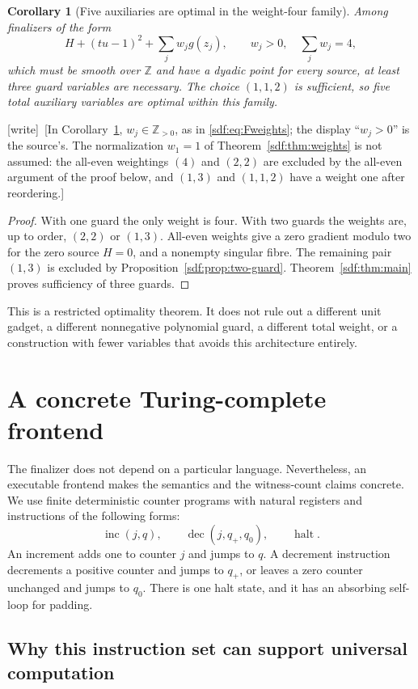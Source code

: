 \documentclass[11pt,a4paper]{article}
\newtheorem{corollary}[theorem]{Corollary}
\theoremstyle{definition}
\theoremstyle{remark}
\newcommand{\Z}{\mathbb Z}
\newcommand{\guard}{g}
\newcommand{\wtag}{\textup{[write]}}
\begin{document}
\begin{corollary}[Five auxiliaries are optimal in the weight-four family]\label{sdf:cor:five}
Among finalizers of the form
\[
 H+(tu-1)^2+\sum_jw_j\guard(z_j),\qquad
 w_j>0,\quad \sum_jw_j=4,
\]
which must be smooth over $\Z$ and have a dyadic point for every source,
at least three guard variables are necessary. The choice $(1,1,2)$ is
sufficient, so five total auxiliary variables are optimal within this family.
\end{corollary}
\noindent\wtag\ [In Corollary~\ref{sdf:cor:five}, $w_j\in\Z_{>0}$, as in
\eqref{sdf:eq:Fweights}; the display ``$w_j>0$'' is the source's. The
normalization $w_1=1$ of Theorem~\ref{sdf:thm:weights} is not assumed: the
all-even weightings $(4)$ and $(2,2)$ are excluded by the all-even argument
of the proof below, and $(1,3)$ and $(1,1,2)$ have a weight one after
reordering.]
\begin{proof}
With one guard the only weight is four. With two guards the weights are,
up to order, $(2,2)$ or $(1,3)$. All-even weights give a zero gradient
modulo two for the zero source $H=0$, and a nonempty singular fibre.
The remaining pair $(1,3)$ is excluded by Proposition~\ref{sdf:prop:two-guard}.
Theorem~\ref{sdf:thm:main} proves sufficiency of three guards.
\end{proof}

This is a restricted optimality theorem. It does not rule out a different
unit gadget, a different nonnegative polynomial guard, a different total
weight, or a construction with fewer variables that avoids this architecture
entirely.

\section{A concrete Turing-complete frontend}\label{sdf:sec:counter}

The finalizer does not depend on a particular language. Nevertheless, an
executable frontend makes the semantics and the witness-count claims
concrete. We use finite deterministic counter programs with natural
registers and instructions of the following forms:
\[
 \operatorname{inc}(j,q),\qquad
 \operatorname{dec}(j,q_+,q_0),\qquad
 \operatorname{halt}.
\]
An increment adds one to counter $j$ and jumps to $q$. A decrement
instruction decrements a positive counter and jumps to $q_+$, or leaves a
zero counter unchanged and jumps to $q_0$. There is one halt state, and it
has an absorbing self-loop for padding.

\subsection{Why this instruction set can support universal computation}
\end{document}
